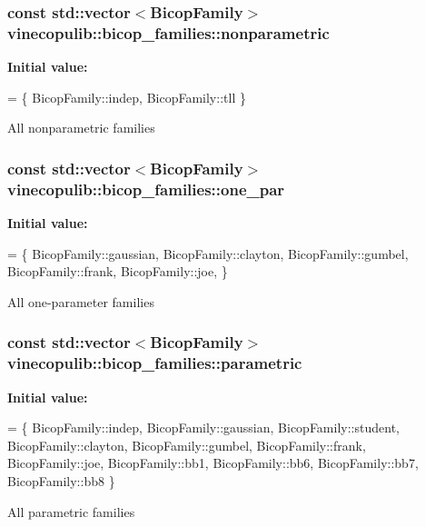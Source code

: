 \subsubsection[{\texorpdfstring{nonparametric}{nonparametric}}]{\setlength{\rightskip}{0pt plus 5cm}const std\+::vector$<${\bf Bicop\+Family}$>$ vinecopulib\+::bicop\+\_\+families\+::nonparametric}\hypertarget{namespacevinecopulib_1_1bicop__families_a01c7c990cc34b1b74d115858a52fcdc5}{}\label{namespacevinecopulib_1_1bicop__families_a01c7c990cc34b1b74d115858a52fcdc5}
{\bfseries Initial value\+:}
\begin{DoxyCode}
= \{
    BicopFamily::indep,
    BicopFamily::tll
\}
\end{DoxyCode}
All nonparametric families 
\subsubsection[{\texorpdfstring{one\+\_\+par}{one_par}}]{\setlength{\rightskip}{0pt plus 5cm}const std\+::vector$<${\bf Bicop\+Family}$>$ vinecopulib\+::bicop\+\_\+families\+::one\+\_\+par}\hypertarget{namespacevinecopulib_1_1bicop__families_aba503484b0a13cfb0e67c026e2f295d4}{}\label{namespacevinecopulib_1_1bicop__families_aba503484b0a13cfb0e67c026e2f295d4}
{\bfseries Initial value\+:}
\begin{DoxyCode}
= \{
    BicopFamily::gaussian,
    BicopFamily::clayton,
    BicopFamily::gumbel,
    BicopFamily::frank,
    BicopFamily::joe,
\}
\end{DoxyCode}
All one-\/parameter families 
\subsubsection[{\texorpdfstring{parametric}{parametric}}]{\setlength{\rightskip}{0pt plus 5cm}const std\+::vector$<${\bf Bicop\+Family}$>$ vinecopulib\+::bicop\+\_\+families\+::parametric}\hypertarget{namespacevinecopulib_1_1bicop__families_a76d66bb6cb03ae4de1cef3d1ed70ac16}{}\label{namespacevinecopulib_1_1bicop__families_a76d66bb6cb03ae4de1cef3d1ed70ac16}
{\bfseries Initial value\+:}
\begin{DoxyCode}
= \{
    BicopFamily::indep,
    BicopFamily::gaussian,
    BicopFamily::student,
    BicopFamily::clayton,
    BicopFamily::gumbel,
    BicopFamily::frank,
    BicopFamily::joe,
    BicopFamily::bb1,
    BicopFamily::bb6,
    BicopFamily::bb7,
    BicopFamily::bb8
\}
\end{DoxyCode}
All parametric families 
